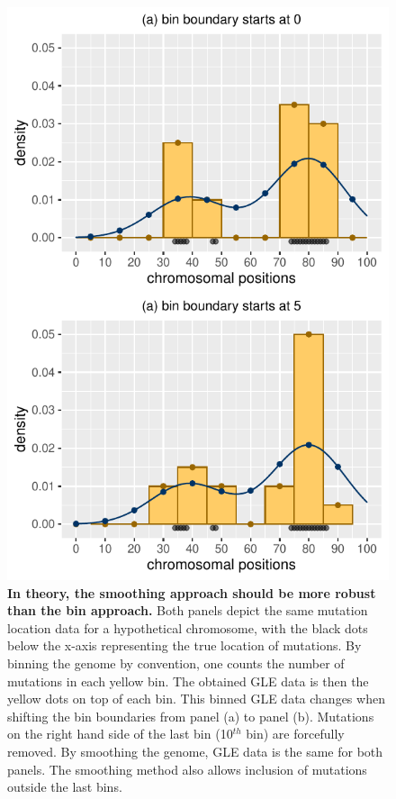 \begin{figure}[h!]
  \begin{minipage}[c]{0.45\textwidth}
    \caption{
      \textbf{In theory, the smoothing approach should be more robust than the bin approach.} Both panels depict the same mutation location data for a hypothetical chromosome, with the black dots below the x-axis representing the true location of mutations. By binning the genome by convention, one counts the number of mutations in each yellow bin. The obtained GLE data is then the yellow dots on top of each bin. This binned GLE data changes when shifting the bin boundaries from panel (a) to panel (b). Mutations on the right hand side of the last bin (10$^{th}$ bin) are forcefully removed. By smoothing the genome, GLE data is the same for both panels. The smoothing method also allows inclusion of mutations outside the last bins.
    } \label{fig:mutdistribution_demo}
  \end{minipage}\hfill
  \begin{minipage}[c]{0.52\textwidth}
    \includegraphics[width=\textwidth]{graphics/mutdistribution_demo.pdf}
  \end{minipage}
\end{figure}
